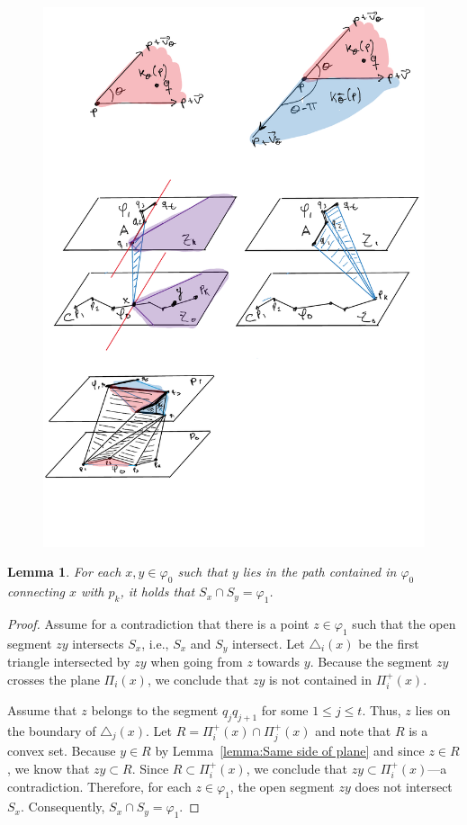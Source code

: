 \documentclass[a4paper, 11pt]{article}
\newtheorem{lemma}[theorem]{Lemma}
\begin{document}
\begin{figure}[tb]
\centering
\includegraphics[width=1\textwidth]{img/Wavefronts.pdf}
\caption{\small }
\label{fig:Wavefronts}
\end{figure}

\begin{lemma}\label{lemma:Disjoint wavefronts}
For each $x, y\in \varphi_0$ such that $y$ lies in the path contained in $\varphi_0$ connecting $x$ with $p_k$,
it holds that $S_x\cap S_y = \varphi_1$.
\end{lemma}
\begin{proof}
Assume for a contradiction that there is a point $z\in \varphi_1$ such that the open segment $zy$ intersects $S_x$, i.e., $S_x$ and $S_y$ intersect.
Let $\triangle_i(x)$ be the first triangle intersected by $zy$ when going from $z$ towards $y$.
Because the segment $zy$ crosses the plane $\Pi_i(x)$, we conclude that $zy$ is not contained in $\Pi_i^+(x)$.

Assume that $z$ belongs to the segment $q_jq_{j+1}$ for some $1\leq j\leq t$. 
Thus, $z$ lies on the boundary of $\triangle_j(x)$. 
Let $R= \Pi^+_i(x)\cap \Pi^+_j(x)$  and note that $R$ is a convex set.
Because $y\in R$ by Lemma~\ref{lemma:Same side of plane} and since $z\in R$, we know that $zy\subset R$.
Since $R\subset \Pi_i^+(x)$, we conclude that $zy\subset \Pi_i^+(x)$---a contradiction. 
Therefore, for each $z\in \varphi_1$, the open segment $zy$ does not intersect $S_x$. 
Consequently, $S_x\cap S_y = \varphi_1$.
\end{proof}
\end{document}
